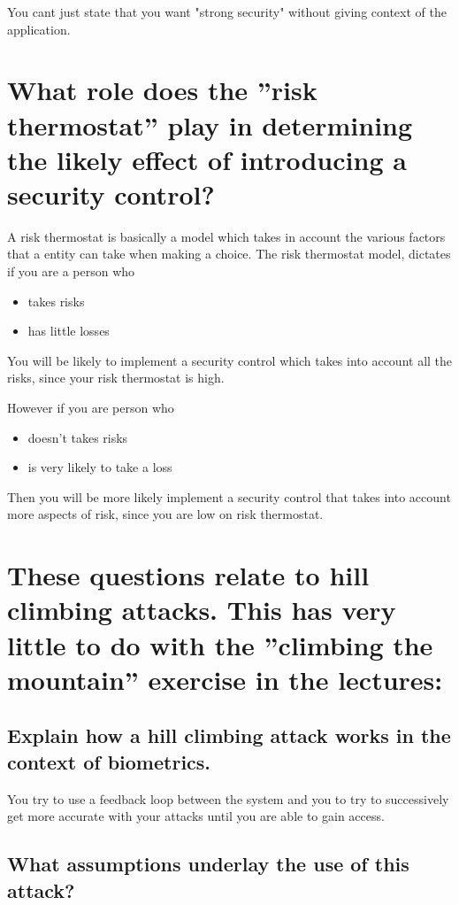 \documentclass{article}
\begin{document}
You cant just state that you want "strong security" without giving context of the application. 


\section[Risk Thermostat]{What role does the ”risk thermostat” play in determining the likely effect of introducing a security control?}

A risk thermostat \cite{riskthermo} is basically a model which takes in account the various factors that a entity can take when making a choice. The risk thermostat model, dictates if you are a person who 

\begin{itemize}
\item takes risks
\item has little losses
\end{itemize}

You will be likely to implement a security control which takes into account all the risks, since your risk thermostat is high.

However if you are person who 

\begin{itemize}
\item doesn't takes risks
\item is very likely to take a loss
\end{itemize}

Then you will be more likely implement a security control that takes into account more aspects of risk, since you are low on risk thermostat. 

\section[Hill Climbing]{These questions relate to hill climbing attacks. This has very little to do with the ”climbing the mountain” exercise in the lectures:}

\subsection[Hill Climbing and biometrics]{Explain how a hill climbing attack works in the context of biometrics.}

You try to use a feedback loop between the system and you to try to successively get more accurate with your attacks until you are able to gain access. 

\subsection[Hill Climbing Assumptions]{What assumptions underlay the use of this attack?}
\end{document}
